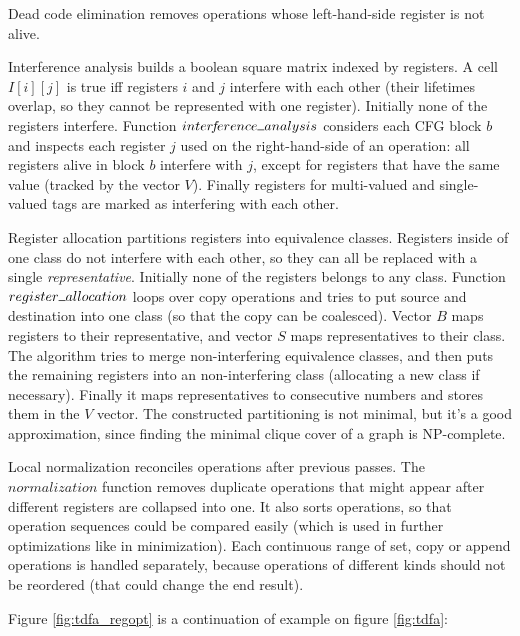 \documentclass[]{article}
\newcommand{\Xund}{\rule{.5em}{.5pt}}
\begin{document}
Dead code elimination removes operations whose left-hand-side register is not alive.
\medskip

Interference analysis builds a boolean square matrix indexed by registers.
A cell $I[i][j]$ is true iff registers $i$ and $j$ interfere with each other
(their lifetimes overlap, so they cannot be represented with one register).
Initially none of the registers interfere.
Function $inter\!f\!erence \Xund analysis$ considers each CFG block $b$ and inspects each register $j$ used on the right-hand-side of an operation:
all registers alive in block $b$ interfere with $j$,
except for registers that have the same value (tracked by the vector $V$).
Finally registers for multi-valued and single-valued tags are marked as interfering with each other.
\medskip

Register allocation partitions registers into equivalence classes.
Registers inside of one class do not interfere with each other, so they can all be replaced with a single \emph{representative}.
Initially none of the registers belongs to any class.
Function $register \Xund allocation$ loops over copy operations
and tries to put source and destination into one class (so that the copy can be coalesced).
Vector $B$ maps registers to their representative, and vector $S$ maps representatives to their class.
The algorithm tries to merge non-interfering equivalence classes,
and then puts the remaining registers into an non-interfering class (allocating a new class if necessary).
Finally it maps representatives to consecutive numbers and stores them in the $V$ vector.
The constructed partitioning is not minimal, but it's a good approximation,
since finding the minimal clique cover of a graph is NP-complete.
\medskip

Local normalization reconciles operations after previous passes.
The $normalization$ function removes duplicate operations that might appear after different registers are collapsed into one.
It also sorts operations, so that operation sequences could be compared easily
(which is used in further optimizations like in minimization).
Each continuous range of set, copy or append operations is handled separately,
because operations of different kinds should not be reordered (that could change the end result).
\medskip

Figure \ref{fig:tdfa_regopt} is a continuation of example on figure \ref{fig:tdfa}:
\medskip
\end{document}
